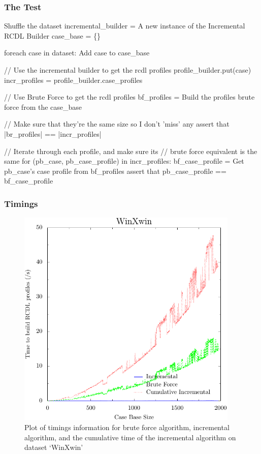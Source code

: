 \documentclass[a4paper,11pt]{report}
\begin{document}
\subsubsection{The Test}
\nopagebreak[4]
\begin{code}
Shuffle the dataset
incremental_builder = A new instance of the Incremental RCDL Builder
case_base = \{\}

foreach case in dataset:
  Add case to case_base
  
  // Use the incremental builder to get the rcdl profiles
  profile_builder.put(case)
  incr_profiles = profile_builder.case_profiles
  
  // Use Brute Force to get the rcdl profiles
  bf_profiles = Build the profiles brute force from the case_base
  
  // Make sure that they're the same size so I don't 'miss' any
  assert that |br_profiles| == |incr_profiles|
  
  // Iterate through each profile, and make sure its 
  // brute force equivalent is the same
  for (pb_case, pb_case_profile) in incr_profiles:
      bf_case_profile = Get pb_case's case profile from bf_profiles
      assert that pb_case_profile == bf_case_profile
\end{code}

\subsubsection{Timings}
\begin{figure}[h!] 
\centering
\includegraphics[width=300pt]{./ExperimentResults/WinXwin_timings_all}
\caption{Plot of timings information for brute force algorithm, incremental algorithm, and the cumulative time of the incremental algorithm on dataset `WinXwin'}
\label{fig:winxwintimingsall}
\end{figure}
\end{document}
